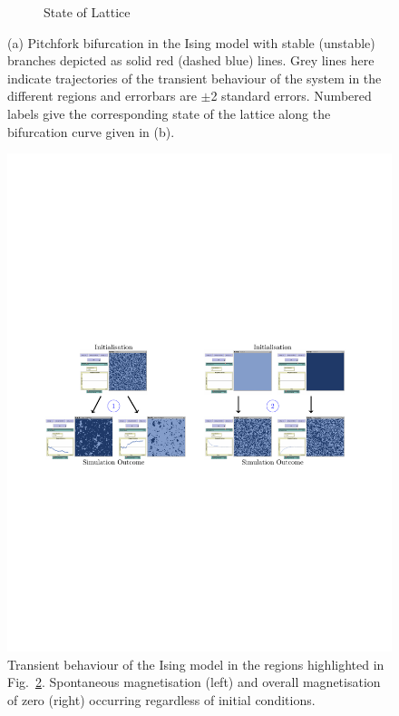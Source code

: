 \documentclass[11pt]{article}
\begin{document}
\begin{figure}[h]
\begin{subfigure}[b]{0.4\textwidth}
\begin{subfigure}[b]{0.3\textwidth}
     \end{subfigure}    
        \caption{State of Lattice}\label{fig:patches}
      \end{subfigure}
        \caption{(a) Pitchfork bifurcation in the Ising model with stable (unstable) branches depicted as solid red (dashed blue) lines. Grey lines here indicate trajectories of the transient behaviour of the system in the different regions and  errorbars are $\pm$2 standard errors. Numbered labels give the corresponding state of the lattice along the bifurcation curve given in (b).\label{fig:ising}}
\end{figure}	
 
\begin{figure}[t]
	\centering
	\includegraphics[width=\linewidth, trim=2cm 10cm 2cm 10cm, clip=true]{IsingSimulations}		
	\caption{Transient behaviour of the Ising model in the regions highlighted in Fig.~\ref{fig:ising}. Spontaneous magnetisation (left) and overall magnetisation of zero (right) occurring regardless of initial conditions. \label{fig:isingTransient}}
\end{figure}
\end{document}
